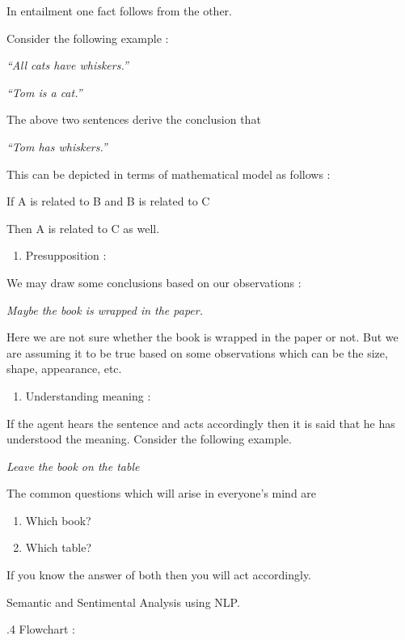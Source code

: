 \documentclass{article} %
\begin{document}
  In entailment one fact follows from the other.

\noindent   Consider the following example :

\noindent \textit{  ``All cats have whiskers.''}

\noindent \textit{  ``Tom is a cat.''}

  The above two sentences derive the conclusion that

\noindent \textit{  ``Tom has whiskers.''}

\noindent   This can be depicted in terms of mathematical model as follows :

\noindent   If A is related to B and B is related to C

\noindent   Then A is related to C as well.\textit{ }

\begin{enumerate}
\item \textit{ }Presupposition :
\end{enumerate}

We may draw some conclusions based on our observations :

\textit{Maybe the book is wrapped in the paper.}

\noindent Here we are not sure whether the book is wrapped in the paper or not. But we are assuming it to be true based on some observations which can be the size, shape, appearance, etc.

\begin{enumerate}
\item   Understanding meaning :
\end{enumerate}

If the agent hears the sentence and acts accordingly then it is said that he has understood the meaning. Consider the following example.

\textit{Leave the book on the table}

The common questions which will arise in everyone's mind are 

\begin{enumerate}
\item  Which book? 

\item  Which table?
\end{enumerate}

If you know the answer of both then you will act accordingly.

\noindent Semantic and Sentimental Analysis using NLP.

.4 Flowchart : 
\end{document}
